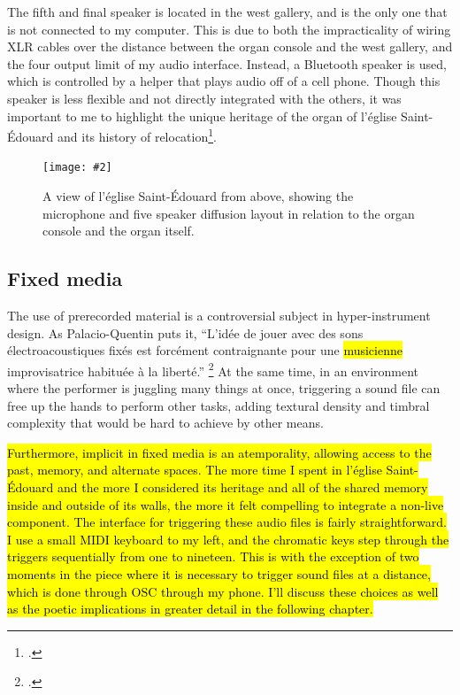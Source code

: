 \documentclass[12pt,twoside,maitrise]{dms_ks}
\newcommand{\customincludegraphics}[4][]{%
    \begin{figure}[H]
        \centering
        \texttt{[image: \#2]}
        \caption{#4}
	\label{#3} 
    \end{figure}
}
\theoremstyle{definition}
\begin{document}
{{The fifth and final speaker is located in the west gallery, and is the only one that is not connected to my computer.
This is due to both the impracticality of wiring XLR cables over the distance between the organ console and the west gallery, and the four output limit of my audio interface.
Instead, a Bluetooth speaker is used, which is controlled by a helper that plays audio off of a cell phone.
Though this speaker is less flexible and not directly integrated with the others, it was important to me to highlight the unique heritage of the organ of l'église Saint-Édouard and its history of relocation}\footcite{noauthor_eglise_nodate}. 


\customincludegraphics[scale=0.6]{stageplot_ste-edouard}{fig:stageplot}{A view of l'église Saint-Édouard from above, showing the microphone and five speaker diffusion layout in relation to the organ console and the organ itself.}

\subsection{Fixed media}

The use of prerecorded material is a controversial subject in hyper-instrument design.
As Palacio-Quentin puts it, “L’idée de jouer avec des sons électroacoustiques fixés est forcément contraignante pour une \hl{musicienne} improvisatrice habituée à la liberté.” \footcite[50]{palacio-quintin_composition_2012-1}
At the same time, in an environment where the performer is juggling many things at once, triggering a sound file can free up the hands to perform other tasks, adding textural density and timbral complexity that would be hard to achieve by other means. 


\hl{Furthermore, implicit in fixed media is an atemporality, allowing access to the past, memory, and alternate spaces.
The more time I spent in l'église Saint-Édouard and the more I considered its heritage and all of the shared memory inside and outside of its walls, the more it felt compelling to integrate a non-live component.
The interface for triggering these audio files is fairly straightforward.
I use a small MIDI keyboard to my left, and the chromatic keys step through the triggers sequentially from one to nineteen. 
This is with the exception of two moments in the piece where it is necessary to trigger sound files at a distance, which is done through OSC through my phone.
I'll discuss these choices as well as the poetic implications in greater detail in the following chapter.}

}
\end{document}
